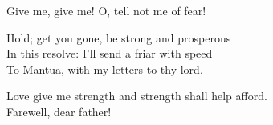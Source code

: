 \begin{speech}
Give me, give me!   O, tell not me of fear! \\
\end{speech}
\begin{speech}
Hold; get you gone, be strong and prosperous \\

In this resolve: I'll send a friar with speed \\
To Mantua, with my letters to thy lord. \\
\end{speech}
\begin{speech}
Love give me strength and strength shall help afford.
\\
Farewell, dear father!  \\
\end{speech}


